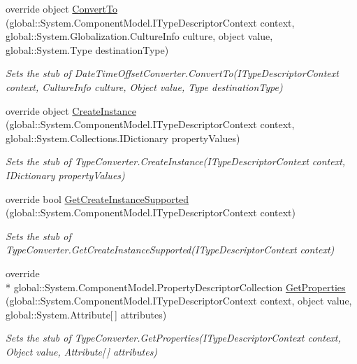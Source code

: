 \begin{DoxyCompactItemize}
override object \hyperlink{class_system_1_1_component_model_1_1_fakes_1_1_stub_date_time_offset_converter_a99ec6e632c1811c7104ddc7bc86defe1}{Convert\-To} (global\-::\-System.\-Component\-Model.\-I\-Type\-Descriptor\-Context context, global\-::\-System.\-Globalization.\-Culture\-Info culture, object value, global\-::\-System.\-Type destination\-Type)
\begin{DoxyCompactList}\small\item\em Sets the stub of Date\-Time\-Offset\-Converter.\-Convert\-To(\-I\-Type\-Descriptor\-Context context, Culture\-Info culture, Object value, Type destination\-Type)\end{DoxyCompactList}\item 
override object \hyperlink{class_system_1_1_component_model_1_1_fakes_1_1_stub_date_time_offset_converter_a3bc9338b612370ddc06962209ea9bf24}{Create\-Instance} (global\-::\-System.\-Component\-Model.\-I\-Type\-Descriptor\-Context context, global\-::\-System.\-Collections.\-I\-Dictionary property\-Values)
\begin{DoxyCompactList}\small\item\em Sets the stub of Type\-Converter.\-Create\-Instance(\-I\-Type\-Descriptor\-Context context, I\-Dictionary property\-Values)\end{DoxyCompactList}\item 
override bool \hyperlink{class_system_1_1_component_model_1_1_fakes_1_1_stub_date_time_offset_converter_a4c5f832922c0868cd52febed21a8c448}{Get\-Create\-Instance\-Supported} (global\-::\-System.\-Component\-Model.\-I\-Type\-Descriptor\-Context context)
\begin{DoxyCompactList}\small\item\em Sets the stub of Type\-Converter.\-Get\-Create\-Instance\-Supported(\-I\-Type\-Descriptor\-Context context)\end{DoxyCompactList}\item 
override \\*
global\-::\-System.\-Component\-Model.\-Property\-Descriptor\-Collection \hyperlink{class_system_1_1_component_model_1_1_fakes_1_1_stub_date_time_offset_converter_a1c065ea844e3593f6b73eff51d4a78b7}{Get\-Properties} (global\-::\-System.\-Component\-Model.\-I\-Type\-Descriptor\-Context context, object value, global\-::\-System.\-Attribute\mbox{[}$\,$\mbox{]} attributes)
\begin{DoxyCompactList}\small\item\em Sets the stub of Type\-Converter.\-Get\-Properties(\-I\-Type\-Descriptor\-Context context, Object value, Attribute\mbox{[}$\,$\mbox{]} attributes)\end{DoxyCompactList}\item 

\end{DoxyCompactItemize}
